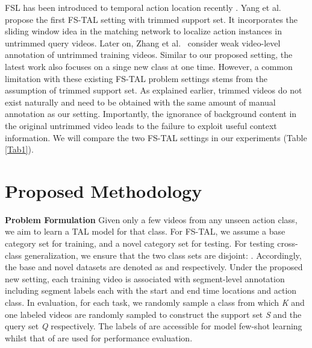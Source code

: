 \documentclass{bmvc2k}
\begin{document}
FSL has been introduced to temporal action location recently \cite{yang2018one,zhang2020metal,yang2020localizing}.
Yang et al.~\cite{yang2018one}
propose the first FS-TAL setting with trimmed support set. It incorporates the sliding window idea in the matching network \cite{vinyals2016matching} to localize action instances in untrimmed query videos.
Later on, Zhang et al.~\cite{zhang2020metal} consider weak video-level annotation of untrimmed training videos.
Similar to our proposed setting, the latest work \cite{yang2018one} also focuses on a singe new class at one time. However, a common limitation with these existing FS-TAL problem settings stems from the assumption of trimmed support set.
As explained earlier,  trimmed videos do not exist naturally and need to be obtained with the same amount of manual annotation as our setting. Importantly, the ignorance of background content in the original untrimmed video leads to the failure to exploit useful context information.
 We will compare the two FS-TAL settings in our experiments (Table \ref{Tab1}).








\vspace{-0.15in}
\section{Proposed Methodology}

{\bf Problem Formulation} 
Given only a few videos from any unseen action class, we aim to learn a TAL model for that class.
For FS-TAL, we assume a base category set  for training, and a novel category set  for testing.
For testing cross-class generalization,
we ensure that the two class sets are disjoint: .
Accordingly, the base and novel datasets are denoted as 
 and  respectively.
Under the proposed new setting, each training video  is associated with
segment-level annotation 
 including  segment labels each with the start and end time locations and action class. 
In evaluation, 
for each task, we randomly sample a class  from which \textit{K} and one labeled videos are randomly sampled to construct the support set \textit{S} and the query set \textit{Q} respectively. 
The labels of  are accessible for model few-shot learning
whilst that of  are used for performance evaluation.
\end{document}
